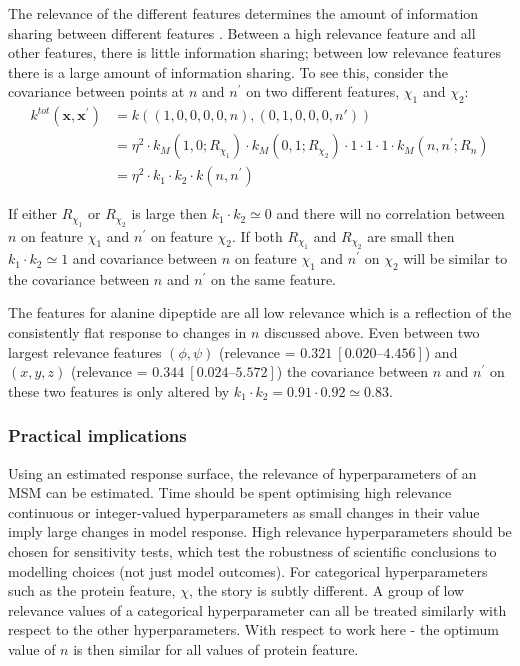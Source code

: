 The relevance of the different features determines the amount of information sharing between different features \cite{duvenaud2011additive}. Between a high relevance feature and all other features, there is little information sharing; between low relevance features there is a large amount of information sharing. To see this, consider the covariance between points at $n$ and $n^{\prime}$ on two different features, $\chi_1$ and $\chi_2$: 
\begin{equation*}
\begin{split}
    k^{tot}(\mathbf{x}, \mathbf{x}^{\prime})& = k\left((1, 0, 0, 0, 0, n), (0, 1, 0, 0, 0, n')\right) \\
    & = \eta^{2}\cdot k_{M}\left(1, 0; R_{\chi_1}\right) \cdot k_{M}\left(0, 1; R_{\chi_2}\right) \cdot 1 \cdot 1\cdot 1 \cdot k_{M}(n, n^{\prime}; R_{n}) \\
    &=  \eta^{2}\cdot k_{1}\cdot k_{2}\cdot k(n, n^{\prime})
\end{split}
\end{equation*}

If either $R_{\chi_1}$ or $R_{\chi_2}$ is large then $k_1 \cdot k_2 \simeq 0$ and there will no correlation between $n$ on feature $\chi_1$ and $n^{\prime}$ on feature $\chi_2$. If both $R_{\chi_1}$ and $R_{\chi_2}$ are small then $k_1 \cdot k_2 \simeq 1$ and covariance between $n$ on feature $\chi_1$ and $n^{\prime}$ on $\chi_2$ will be similar to the covariance between $n$ and $n^{\prime}$ on the same feature.  

The features for alanine dipeptide are all low relevance which is a reflection of the  consistently flat response to changes in $n$ discussed above. Even between  two largest relevance features $(\phi, \psi)$ (relevance = $0.321\ [\numrange[range-phrase=\text{--}]{0.020}{4.456}]$) and $(x,y,z)$ (relevance = $0.344\ [\numrange[range-phrase=\text{--}]{0.024}{5.572}]$) the covariance between $n$ and $n^{\prime}$ on these two features is only altered by  $k_{1}\cdot k_{2} = 0.91\cdot0.92 \simeq 0.83$. 

\subsubsection{Practical implications}

Using an estimated response surface, the relevance of hyperparameters of an MSM can be estimated. Time should be spent optimising high relevance continuous or integer-valued hyperparameters as small changes in their value imply large changes in model response. High relevance hyperparameters should be chosen for sensitivity tests, which test the robustness of scientific conclusions to modelling choices (not just model outcomes). For  categorical hyperparameters such as the protein feature, $\chi$, the story is subtly different.  A group of low relevance values of a categorical hyperparameter can all be treated similarly with respect to the other hyperparameters. With respect to work here - the optimum value of $n$ is then similar for all values of protein feature.


